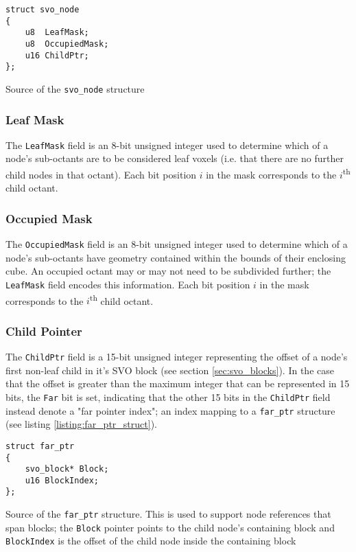 \begin{listing}[ht]
\begin{verbatim}
struct svo_node
{
    u8  LeafMask;
    u8  OccupiedMask;
    u16 ChildPtr;
};
\end{verbatim}
\caption{Source of the \texttt{svo\_node} structure}
\label{listing:svo_node_struct}
\end{listing}

\subsubsection{Leaf Mask}
The \texttt{LeafMask} field is an 8-bit unsigned integer used to determine which of a node's sub-octants are to be considered leaf voxels (i.e. that there are no further child nodes in that octant). Each bit position $i$ in the mask corresponds to the $i$\textsuperscript{th} child octant.

\subsubsection{Occupied Mask}
The \texttt{OccupiedMask} field is an 8-bit unsigned integer used to determine which of a node's sub-octants have geometry contained within the bounds of their enclosing cube. An occupied octant may or may not need to be subdivided further; the \texttt{LeafMask} field encodes this information. Each bit position $i$ in the mask corresponds to the $i$\textsuperscript{th} child octant.

\subsubsection{Child Pointer}
The \texttt{ChildPtr} field is a 15-bit unsigned integer representing the offset of a node's first non-leaf child in it's SVO block (see section \ref{sec:svo_blocks}). In the case that the offset is greater than the maximum integer that can be represented in 15 bits, the \texttt{Far} bit is set, indicating that the other 15 bits in the \texttt{ChildPtr} field instead denote a "far pointer index"; an index mapping to a \texttt{far\_ptr} structure (see listing \ref{listing:far_ptr_struct}).

\begin{listing}
\begin{verbatim}
struct far_ptr
{
    svo_block* Block;
    u16 BlockIndex;
};
\end{verbatim}
\caption{Source of the \texttt{far\_ptr} structure. This is used to support node references that span blocks; the \texttt{Block} pointer points to the child node's containing block and \texttt{BlockIndex} is the offset of the child node inside the containing block}
\label{listing:far_ptr_struct}
\end{listing}

